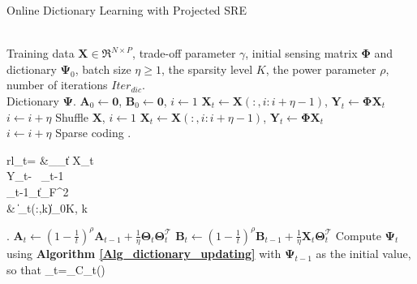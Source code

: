 \documentclass[final,5p,times,twocolumn]{elsarticle}
\begin{document}
\begin{algorithm}[htb]
	\caption{Online Dictionary Learning with Projected SRE}%
	\label{Alg_dictionary_involve_projection}
	\begin{algorithmic}[1]
		\REQUIRE ~\\
		Training data $\bm X\in \Re^{N\times P}$, trade-off parameter $\gamma$, initial sensing matrix $\bm\Phi$ and dictionary $\bm\Psi_0$, batch size $\eta\geq1$, the sparsity level $K$, the power parameter $\rho$, number of iterations $Iter_{dic}$.
		\lastcon ~\\          %
		Dictionary $\bm\Psi$.
		\STATE $\bm A_0 \leftarrow \bm 0$, $\bm B_0 \leftarrow \bm 0$, $i\leftarrow 1$
		\STATE $\bm X_{t}\leftarrow\bm X(:,i:i+\eta-1)$, $\bm Y_t\leftarrow \bm\Phi\bm X_t$\\
		$i\leftarrow i+\eta$
		\ELSE
		\STATE Shuffle $\bm X$, $i\leftarrow 1$
		\STATE $\bm X_t\leftarrow\bm X(:,i:i+\eta-1)$, $\bm Y_t\leftarrow \bm\Phi\bm X_t$\\
		$i\leftarrow i+\eta$
		\ENDIF
		\STATE Sparse coding
		\e
		\left.\begin{array}{rl}\bm \Theta_{t}= &\arg\min_{\tilde{\bm\Theta}_{t}}\left\|\bmat\sqrt{\gamma} \bm X_{t}\\\bm Y_t\emat-\bmat\sqrt{\gamma}~ \bm\Psi_{t-1}\\ \bm\Phi\bm\Psi_{t-1}\emat\tilde{\bm\Theta}_t\right\|_F^2 \\
			&~\|\tilde{\bm\Theta}_t(:,k)\|_0\leq K, \forall k
		\end{array}\right.\label{sparse_coding}
		\ee
		\STATE $\bm A_t\leftarrow (1-\frac{1}{t})^\rho\bm A_{t-1}+\frac{1}{\eta}\bm \Theta_{t}\bm \Theta_{t}^\mathcal T$\label{Alg_dictionary_involve_projection:A_t}
		\STATE $\bm B_t\leftarrow (1-\frac{1}{t})^\rho\bm B_{t-1}+\frac{1}{\eta}\bm X_{t}\bm \Theta_{t}^\mathcal T$\label{Alg_dictionary_involve_projection:B_t}
		\STATE Compute $\bm\Psi_t$ using {\bf Algorithm \ref{Alg_dictionary_updating}} with $\bm\Psi_{t-1}$  as the initial value, so that
		\en
		\bm\Psi_t=\arg\min_{\bm\Psi\in\mathcal C}\hat \sigma_t(\bm\Psi)
		\een
		

\end{algorithmic}
\end{algorithm}
\end{document}
